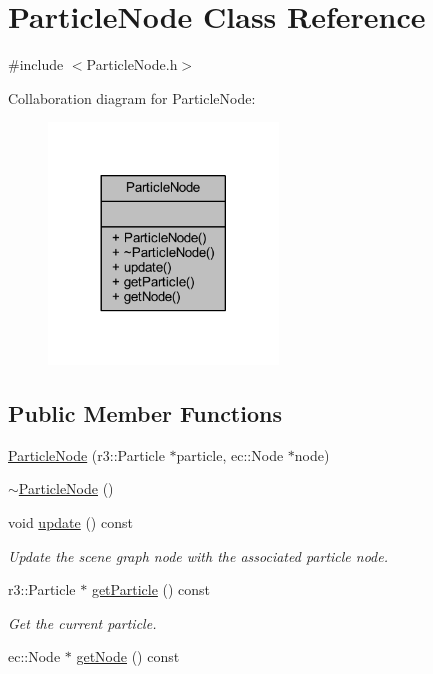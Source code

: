 \hypertarget{class_particle_node}{}\section{Particle\+Node Class Reference}
\label{class_particle_node}


{\ttfamily \#include $<$Particle\+Node.\+h$>$}



Collaboration diagram for Particle\+Node\+:\nopagebreak
\begin{figure}[H]
\begin{center}
\leavevmode
\includegraphics[width=173pt]{class_particle_node__coll__graph}
\end{center}
\end{figure}
\subsection*{Public Member Functions}
\begin{DoxyCompactItemize}
\item 
\mbox{\hyperlink{class_particle_node_a39d9346a90936874b5093445aedca01c}{Particle\+Node}} (r3\+::\+Particle $\ast$particle, ec\+::\+Node $\ast$node)
\item 
\mbox{\hyperlink{class_particle_node_a7ecd9860e75bd4ec3842cc0d0a09cf8b}{$\sim$\+Particle\+Node}} ()
\item 
void \mbox{\hyperlink{class_particle_node_a5324b80595caa65c3e6dbef47ecce09b}{update}} () const
\begin{DoxyCompactList}\small\item\em Update the scene graph node with the associated particle node. \end{DoxyCompactList}\item 
r3\+::\+Particle $\ast$ \mbox{\hyperlink{class_particle_node_a4aaf29e469127cd57a8918f11aacadfb}{get\+Particle}} () const
\begin{DoxyCompactList}\small\item\em Get the current particle. \end{DoxyCompactList}\item 
ec\+::\+Node $\ast$ \mbox{\hyperlink{class_particle_node_add76b91ffda0c229d0d4f1876e671894}{get\+Node}} () const
\end{DoxyCompactItemize}


